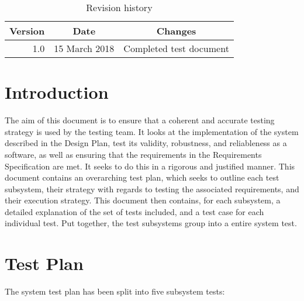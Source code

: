 \documentclass[12pt]{article}
\newcounter{req ID}
\begin{document}
                \begin{table}[htbp]
                    \caption{Revision history}
                    \begin{center}
                        \begin{tabular}{|r | c| c |}
                            \hline
                            Version & Date & Changes \\
                            \hline
                            1.0 & 15 March 2018 & Completed test document \\
                            \hline
                        \end{tabular}
                    \end{center}
                \end{table}


                \tableofcontents
\listoffigures
\clearpage
\listoftables

\clearpage

\section{Introduction}

The aim of this document is to ensure that a coherent and accurate testing strategy is used by the testing team. It looks at the implementation of the system described in the Design Plan, test its validity, robustness, and reliableness as a software, as well as ensuring that the requirements in the Requirements Specification are met. It seeks to do this in a rigorous and justified manner.
This document contains an overarching test plan, which seeks to outline each test subsystem, their strategy with regards to testing the associated requirements, and their execution strategy. This document then contains, for each subsystem, a detailed explanation of the set of tests included, and a test case for each individual test. Put together, the test subsystems group into a entire system test.

\section{Test Plan}

The system test plan has been split into five subsystem tests:
\end{document}
